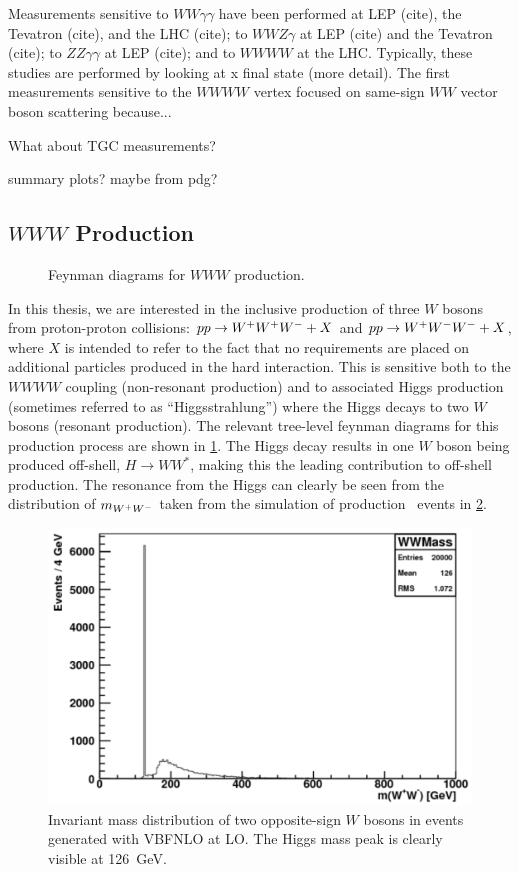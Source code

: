 Measurements sensitive to $WW\gamma\gamma$
have been performed at LEP (cite), the Tevatron (cite), and the LHC (cite); 
to $WWZ\gamma$ at LEP (cite)
and the Tevatron (cite); to $ZZ\gamma\gamma$ at LEP (cite); 
and to $WWWW$ at the LHC. Typically, these studies are performed
by looking at x final state (more detail). 
The first measurements sensitive to the $WWWW$ vertex focused on 
same-sign $WW$ vector boson scattering because...


What about TGC measurements?

summary plots? maybe from pdg?


\subsection{$WWW$ Production}

\begin{figure}[ht]
\centering
\caption{Feynman diagrams for $WWW$ production.}
\label{fig:theory_feynman_www}
\end{figure}

In this thesis, we are interested in the inclusive production of three
$W$ bosons from proton-proton collisions:
$pp\rightarrow\- W^{+}W^{+}W^{-}+X$ and $pp\rightarrow W^{+}W^{-}W^{-}\allowbreak +X$, 
where $X$ is intended to refer to the fact that no requirements are 
placed on additional particles produced in the hard interaction.
This is sensitive both
to the $WWWW$ coupling (non-resonant production) 
and to associated Higgs production (sometimes referred to as
``Higgsstrahlung'') where the Higgs decays to two
$W$ bosons (resonant production). 
The relevant
tree-level feynman diagrams for this production process are shown in 
\fig\ref{fig:theory_feynman_www}.
The Higgs decay results in one $W$ boson being produced off-shell,
$H\rightarrow WW^*$, making this the leading contribution to off-shell
production.  
The resonance from the Higgs can clearly be seen from the 
distribution of $m_{W^{+}W^{-}}$ taken from the simulation of production \www~events
in \fig\ref{fig:mww_higgs}.

\begin{figure}[ht]
\centering
\includegraphics[width=0.5\columnwidth]{figures/2l2j/mWW-parton.pdf}
\caption{ Invariant mass distribution of two opposite-sign $W$ bosons 
in \www events generated with VBFNLO at LO. The Higgs mass peak is clearly 
visible at 126~GeV.}
\label{fig:mww_higgs}
\end{figure}



